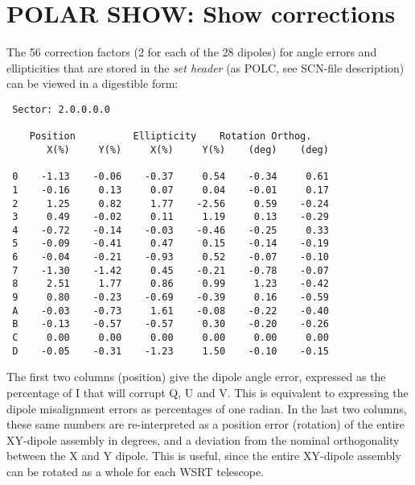 \section{POLAR SHOW: Show corrections}
\label{.show}

The 56 correction factors (2 for each of the 28 dipoles) for angle errors and
ellipticities that are stored in the {\em set header} (as POLC, see SCN-file
description) can be viewed in a digestible form:

\spbegin %
\spend %
%
\spbegin %
\spend %
%
\spbegin %
\svbegin \begin{verbatim}
 Sector: 2.0.0.0.0

	Position          Ellipticity    Rotation Orthog.
       X(%)     Y(%)     X(%)     Y(%)    (deg)    (deg)

 0    -1.13    -0.06    -0.37     0.54    -0.34     0.61
 1    -0.16     0.13     0.07     0.04    -0.01     0.17
 2     1.25     0.82     1.77    -2.56     0.59    -0.24
 3     0.49    -0.02     0.11     1.19     0.13    -0.29
 4    -0.72    -0.14    -0.03    -0.46    -0.25     0.33
 5    -0.09    -0.41     0.47     0.15    -0.14    -0.19
 6    -0.04    -0.21    -0.93     0.52    -0.07    -0.10
 7    -1.30    -1.42     0.45    -0.21    -0.78    -0.07
 8     2.51     1.77     0.86     0.99     1.23    -0.42
 9     0.80    -0.23    -0.69    -0.39     0.16    -0.59
 A    -0.03    -0.73     1.61    -0.08    -0.22    -0.40
 B    -0.13    -0.57    -0.57     0.30    -0.20    -0.26
 C     0.00     0.00     0.00     0.00     0.00     0.00
 D    -0.05    -0.31    -1.23     1.50    -0.10    -0.15
\end{verbatim}\svend
\spend %

The first two columns (position) give the dipole angle error, expressed as the
percentage of I that will corrupt Q, U and V. This is equivalent to expressing
the dipole misalignment errors as percentages of one radian. In the last two
columns, these same numbers are re-interpreted as a position error (rotation)
of the entire XY-dipole assembly in degrees, and a deviation from the nominal
orthogonality between the X and Y dipole. This is useful, since the entire
XY-dipole assembly can be rotated as a whole for each WSRT telescope.

